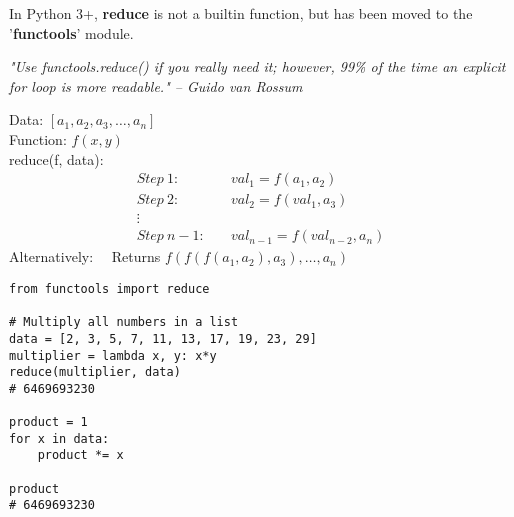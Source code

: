 \documentclass{beamer}
\begin{document}
\begin{frame}[fragile]{}
In Python 3+, \textbf{reduce} is not a builtin function, but has been
moved to the '\textbf{functools}' module.\par \vspace{5pt}
\textit{"Use functools.reduce() if you really need it; however, 99\% of the 
time an explicit for loop is more readable." -- Guido van Rossum}\par \vspace{10pt}
Data: $[a_1, a_2, a_3, \dots, a_n]$\\
Function: $f(x, y)$\\
reduce(f, data):
\begin{align*}
Step\ 1:\quad   &val_1=f(a_1, a_2)\\
Step\ 2:\quad   &val_2=f(val_1, a_3)\\
\vdots\\
Step\ n-1:\quad &val_{n-1}=f(val_{n-2}, a_n)
\end{align*}
Alternatively:
\ \ Returns $f(f(f(a_1, a_2), a_3),\dots,a_n)$
\end{frame}

\begin{frame}[fragile]{}
\begin{verbatim}
from functools import reduce

# Multiply all numbers in a list
data = [2, 3, 5, 7, 11, 13, 17, 19, 23, 29]
multiplier = lambda x, y: x*y
reduce(multiplier, data)
# 6469693230

product = 1
for x in data:
    product *= x

product
# 6469693230
\end{verbatim}
\end{frame}
\end{document}
